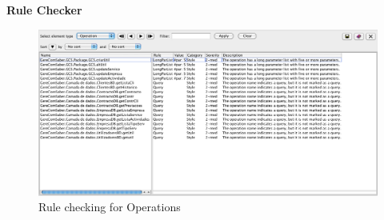 \textbf{Rule Checker}
\begin{figure}[H]
\begin{center}
\includegraphics[width=1\textwidth]{images/rule.png}
\caption{Rule checking for Operations}\label{img:rule}
\end{center}
\end{figure} 

